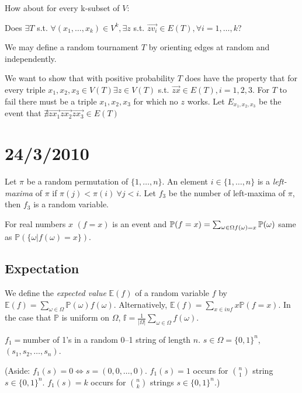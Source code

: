 \documentclass{article}
\begin{document}
How about for every k-subset of $V$:

Does $\exists T$ s.t. $\forall (x_1, \dots, x_k) \in V^k, \exists z $ s.t. $\overrightarrow{z v_i} \in E(T), \forall i =1,\dots,k$?

We may define a random tournament $T$ by orienting edges at random and independently.

We want to show that with positive probability $T$ does have the property that for every triple $x_1, x_2, x_3 \in V(T) \exists z \in V(T)$ s.t. $\overrightarrow{z x} \in E(T), i = 1, 2, 3$.  For $T$ to fail there must be a triple $x_1, x_2, x_3$ for which no $z$ works.  Let $E_{x_1,x_2, x_3}$ be the event that $\nexists \overrightarrow{z x_1} \overrightarrow{z x_2} \overrightarrow{z x_3} \in E(T)$



\section*{24/3/2010}

\begin{examp}
Let $\pi$ be a random permutation of $\{1, \ldots, n\}$.  An element $i \in \{1, \ldots, n \}$ is a \emph{left-maxima} of $\pi$ if $\pi(j) < \pi(i) ~ \forall j<i$. Let $f_3$ be the number of left-maxima of $\pi$, then $f_3$ is a random variable.
\end{examp}

For real numbers $x$ $(f = x)$ is an event and $\mathbb{P}(f=x) = \sum_{\substack \omega \in \Omega \\ f(\omega)=x} \mathbb{P}(\omega)$ same as $\mathbb{P}(\{\omega | f(\omega) = x \})$.

\subsection*{Expectation}

We define the \emph{expected value} $\mathbb{E}(f)$ of a random variable $f$ by $\mathbb{E}(f)= \sum_{\omega \in \Omega} \mathbb{P}(\omega)f(\omega)$. Alternatively, $\mathbb{E}(f) = \sum_{x \in inf} x \mathbb{P}(f =x)$.  In the case that $\mathbb{P}$ is uniform on $\Omega$, $\mathbb{f} = \frac{1}{|\Omega|} \sum_{\omega \in \Omega} f(\omega)$.

$f_1 = $number of 1's in a random 0--1 string of length $n$. $s \in \Omega = \{0,1\}^n$, $(s_1, s_2, \ldots, s_n)$.

(Aside: $f_1 (s) = 0 \iff s = (0, 0, \ldots, 0)$. $f_1 (s) = 1$ occurs for ${n \choose 1}$ string $s \in \{0,1\}^n$.  $f_1 (s) = k$ occurs for ${n \choose k}$ strings $s \in \{0,1\}^n$.)
\end{document}
